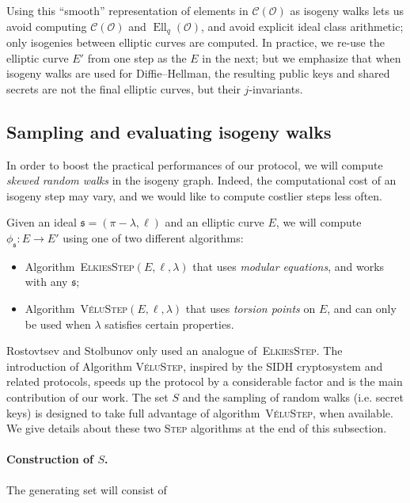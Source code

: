 \documentclass{llncs}
\newcommand{\Cl}{\mathcal{C}}
\renewcommand{\O}{\mathcal{O}}
\newcommand{\algstyle}[1]{\textsc{#1}}
\renewcommand{\frak}{\mathfrak}
\DeclareMathOperator{\Ell}{Ell}
\begin{document}
Using this ``smooth'' representation of elements
in $\Cl(\O)$ as isogeny walks
lets us avoid computing $\Cl(\O)$ and $\Ell_q(\O)$,
and avoid explicit ideal class arithmetic;
only isogenies between elliptic curves are computed.
In practice, we re-use the elliptic curve $E'$ from one step
as the $E$ in the next;
but we emphasize that
when isogeny walks are used for Diffie--Hellman,
the resulting public keys and shared secrets
are not the final elliptic curves,
but their $j$-invariants.


\subsection{Sampling and evaluating isogeny walks}

In order to boost the practical performances of our protocol,
we will compute \emph{skewed random walks} in the isogeny graph.
Indeed, the computational cost of an isogeny step may vary, and
we would like to compute costlier steps less often.

Given an ideal $\frak s = (\pi-\lambda, \ell)$ and an elliptic curve $E$,
we will compute $\phi_{\frak s}:E\to E'$ using one of two different algorithms:
\begin{itemize}
\item Algorithm~\algstyle{ElkiesStep}$(E, \ell, \lambda)$ that uses
	\emph{modular equations}, and works with any $\frak s$;
\item Algorithm~\algstyle{VéluStep}$(E, \ell,\lambda)$ that
	uses \emph{torsion points} on $E$, and can only be used when
	$\lambda$ satisfies certain properties.
\end{itemize}

Rostovtsev and Stolbunov only used an analogue of~\algstyle{ElkiesStep}. 
The introduction of Algorithm \algstyle{VéluStep}, 
inspired by the SIDH cryptosystem and related protocols,
speeds up the protocol by a considerable factor and
is the main contribution of our work. The set $S$ and the
sampling of random walks (i.e. secret keys) is designed
to take full advantage of algorithm~\algstyle{VéluStep},
when available. We give details about these two \algstyle{Step}
algorithms at the end of this subsection.

\paragraph{Construction of $S$.} The generating set will consist of
\end{document}
